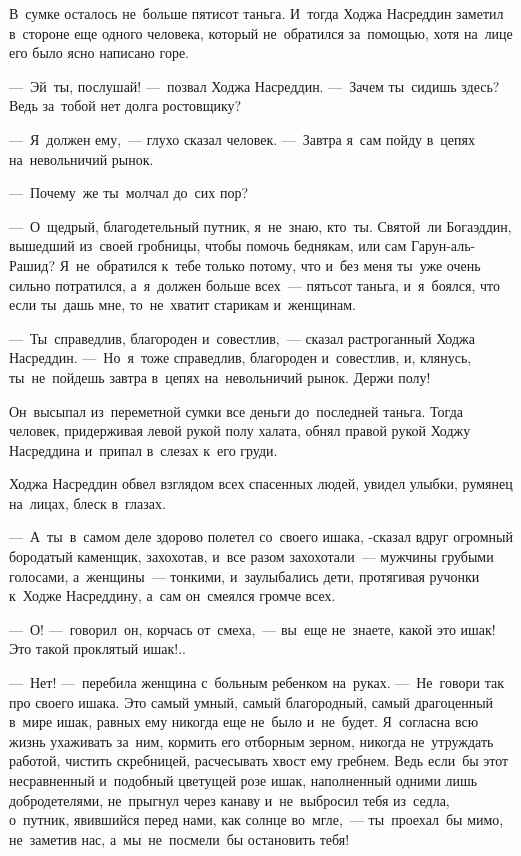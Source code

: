 \documentclass[12pt,a4paper]{book}
\begin{document}
В~сумке осталось не~больше пятисот таньга. И~тогда Ходжа Насреддин заметил в~стороне еще одного человека, который не~обратился за~помощью, хотя на~лице его было ясно написано горе.

—~Эй~ты, послушай! —~позвал Ходжа Насреддин. —~Зачем ты~сидишь здесь? Ведь за~тобой нет долга ростовщику?

—~Я~должен ему,~— глухо сказал человек. —~Завтра я~сам пойду в~цепях на~невольничий рынок.

—~Почему~же ты~молчал до~сих пор?

—~О~щедрый, благодетельный путник, я~не~знаю, кто~ты. Святой~ли Богаэддин, вышедший из~своей гробницы, чтобы помочь беднякам, или сам Гарун-аль-Рашид? Я~не~обратился к~тебе только потому, что и~без меня ты~уже очень сильно потратился, а~я~должен больше всех~— пятьсот таньга, и~я~боялся, что если ты~дашь мне, то~не~хватит старикам и~женщинам.

—~Ты~справедлив, благороден и~совестлив,~— сказал растроганный Ходжа Насреддин. —~Но~я~тоже справедлив, благороден и~совестлив, и, клянусь, ты~не~пойдешь завтра в~цепях на~невольничий рынок. Держи полу!

Он~высыпал из~переметной сумки все деньги до~последней таньга. Тогда человек, придерживая левой рукой полу халата, обнял правой рукой Ходжу Насреддина и~припал в~слезах к~его груди.

Ходжа Насреддин обвел взглядом всех спасенных людей, увидел улыбки, румянец на~лицах, блеск в~глазах.

—~А~ты~в~самом деле здорово полетел со~своего ишака, -сказал вдруг огромный бородатый каменщик, захохотав, и~все разом захохотали~— мужчины грубыми голосами, а~женщины~— тонкими, и~заулыбались дети, протягивая ручонки к~Ходже Насреддину, а~сам он~смеялся громче всех.

—~О! —~говорил~он, корчась от~смеха,~— вы~еще не~знаете, какой это ишак! Это такой проклятый ишак!..

—~Нет! —~перебила женщина с~больным ребенком на~руках. —~Не~говори так про своего ишака. Это самый умный, самый благородный, самый драгоценный в~мире ишак, равных ему никогда еще не~было и~не~будет. Я~согласна всю жизнь ухаживать за~ним, кормить его отборным зерном, никогда не~утруждать работой, чистить скребницей, расчесывать хвост ему гребнем. Ведь если~бы этот несравненный и~подобный цветущей розе ишак, наполненный одними лишь добродетелями, не~прыгнул через канаву и~не~выбросил тебя из~седла, о~путник, явившийся перед нами, как солнце во~мгле,~— ты~проехал~бы мимо, не~заметив нас, а~мы~не~посмели~бы остановить тебя!
\end{document}
